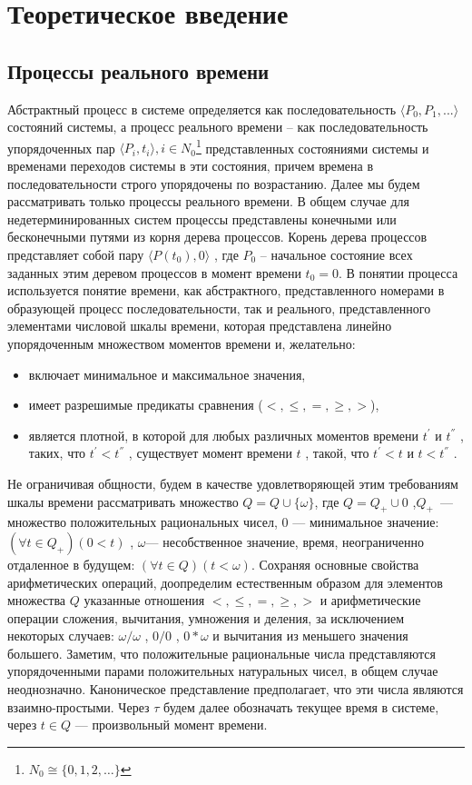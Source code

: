 \chapter{Теоретическое введение}
\section{Процессы реального времени}
Абстрактный процесс в системе определяется как последовательность $ \langle P_0,P_1,...\rangle $   состояний системы, а процесс реального времени – как последовательность упорядоченных пар $ \langle P_i,t_i \rangle, i\in N_0 $\footnote{$ N_0 \cong \{0,1,2,\dots\}$} представленных состояниями системы и временами переходов системы в эти состояния, причем времена в последовательности строго упорядочены по возрастанию. 
Далее мы будем рассматривать только процессы реального времени. 
В общем случае для недетерминированных систем процессы представлены конечными или бесконечными путями из корня дерева процессов. 
Корень дерева процессов представляет собой пару $ \langle P(t_0),0 \rangle $ , где $ P_0 $  – начальное состояние всех заданных этим деревом процессов в момент времени  $ t_0 = 0 $. 
В понятии процесса используется понятие времени, как абстрактного, представленного номерами в образующей процесс последовательности, так и реального, представленного элементами числовой шкалы времени, которая представлена линейно упорядоченным множеством моментов времени и, желательно: 
\begin{itemize}
	\item включает минимальное и максимальное значения, 
	\item имеет разрешимые предикаты сравнения ($ <,\leq,=,\geq, > $),
	\item является плотной, в которой для любых различных моментов времени $ t^{'} $  и $ t^{''} $  , таких, что $ t^{'}<t^{''} $ , существует момент времени $ t $ , такой, что  $ t^{'}<t $  и $ t<t^{''} $ .
\end{itemize}

Не ограничивая общности, будем в качестве удовлетворяющей этим требованиям шкалы времени рассматривать множество $ Q = Q \cup \{\omega\} $, где $ Q=Q_+\cup{0} $ ,$ Q_+ $~--- множество положительных рациональных чисел, $ 0 $ --- минимальное значение:$ (\forall t \in Q_+) (0<t) $ , $ \omega $--- несобственное значение, время, неограниченно отдаленное в будущем: $ (\forall t \in Q) (t<\omega) $. 
Сохраняя основные свойства арифметических операций, доопределим естественным образом для элементов множества $ Q $ указанные отношения $ <,\leq,=,\geq, > $ и арифметические операции сложения, вычитания, умножения и деления, за исключением некоторых случаев: $ \omega/\omega $ , $ 0/0 $ , $ 0*\omega $  и вычитания из меньшего значения большего. 
Заметим, что положительные рациональные числа представляются упорядоченными парами положительных натуральных чисел, в общем случае неоднозначно. Каноническое представление предполагает, что эти числа являются взаимно-простыми. Через $ \tau $   будем далее обозначать текущее время в системе, через $ t\in Q $  --- произвольный момент времени.  


